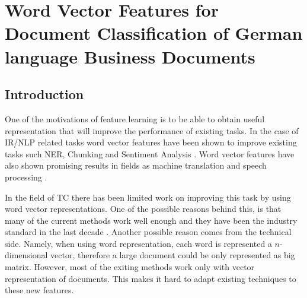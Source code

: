 \chapter{Word Vector Features  for Document Classification of German language Business Documents}
\label{chap:rel_word2vec_doc_classification}




\section{Introduction}
\label{sec:w2v4tc_intro}

One of the motivations of feature learning is to be able to
obtain useful representation that will improve the performance of  existing tasks. In the case of
\ac{IR}/\ac{NLP} related tasks  word vector features have been shown to
improve existing tasks such \ac{NER}, Chunking and Sentiment Analysis
\cite{Turian:2010:WRS:1858681.1858721}
\cite{DBLP:journals/corr/abs-1103-0398}. Word vector features have also shown
promising results in fields as machine translation and speech processing \cite{collobert:2008}
\cite{DBLP:journals/corr/MikolovLS13}.  

In the field of \ac{TC}  there has been  limited work on improving  this
task by using word vector representations. One of the  possible reasons  behind this,
is that many of the current  methods work well enough and they have been the industry standard in the last decade \cite{Sebastiani02} . Another possible reason comes from the
technical side. Namely, when using word representation, each word is represented a $n$-dimensional vector, therefore a large document could be only
represented as big matrix. However, most of the exiting methods work only with vector
representation of documents. This makes  it hard to adapt existing
techniques to these new features.  


